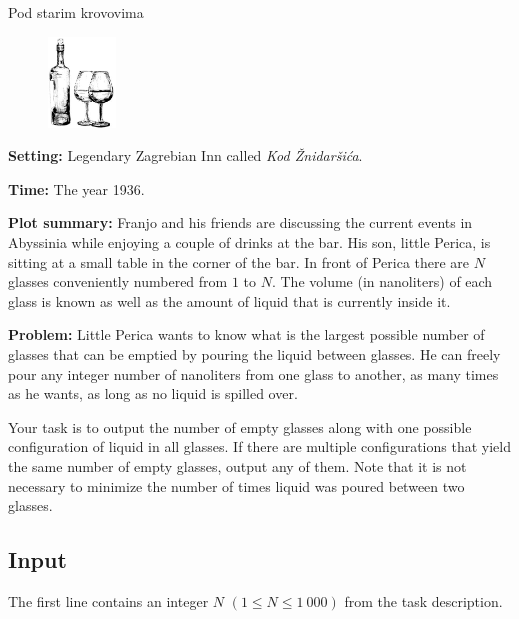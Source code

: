 \begin{statement}[
  problempoints=50,
  timelimit=1 second,
  memorylimit=512 MiB,
]{Pod starim krovovima}

\setlength\intextsep{-0.1cm}
\begin{figure}
\centering
\includegraphics[width=0.16\textwidth]{img/psk.png}
\end{figure}


\textbf{Setting:} Legendary Zagrebian Inn called \textit{Kod Žnidaršića}.

\textbf{Time:} The year 1936.

\textbf{Plot summary:} Franjo and his friends are discussing the current events
in Abyssinia while enjoying a couple of drinks at the bar. His son, little
Perica, is sitting at a small table in the corner of the bar. In front of
Perica there are $N$ glasses conveniently numbered from $1$ to $N$. The volume
(in nanoliters) of each glass is known as well as the amount of liquid that
is currently inside it.

\textbf{Problem:} Little Perica wants to know what is the largest possible
number of glasses that can be emptied by pouring the liquid between glasses.
He can freely pour any integer number of nanoliters from one glass to another,
as many times as he wants, as long as no liquid is spilled over.

Your task is to output the number of empty glasses along with one possible
configuration of liquid in all glasses. If there are multiple configurations
that yield the same number of empty glasses, output any of them. Note that it
is not necessary to minimize the number of times liquid was poured between two
glasses.

\subsection*{Input}
The first line contains an integer $N$ $(1 \le N \le 1\ 000)$ from the task
description.


\end{statement}
